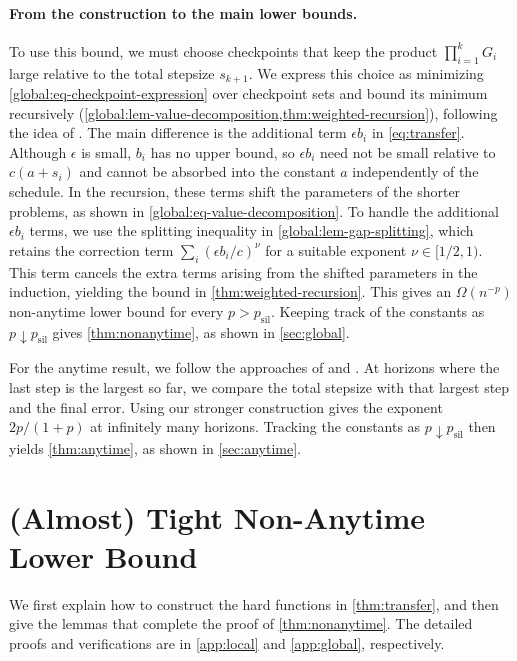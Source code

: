 \documentclass[11pt,letterpaper]{article}
\theoremstyle{definition}
\newcommand{\psil}{p_{\mathrm{sil}}}
\begin{document}
\paragraph{From the construction to the main lower bounds.}
To use this bound, we must choose checkpoints that keep the product $\prod_{i=1}^kG_i$ large relative to the total stepsize $s_{k+1}$.
We express this choice as minimizing \eqref{global:eq-checkpoint-expression} over checkpoint sets and bound its minimum recursively (\cref{global:lem-value-decomposition,thm:weighted-recursion}), following the idea of \citet[Section~3]{JungChoYun2026}.
The main difference is the additional term $\epsilon b_i$ in \eqref{eq:transfer}.
Although $\epsilon$ is small, $b_i$ has no upper bound, so $\epsilon b_i$ need not be small relative to $c(a+s_i)$ and cannot be absorbed into the constant $a$ independently of the schedule.
In the recursion, these terms shift the parameters of the shorter problems, as shown in \eqref{global:eq-value-decomposition}.
To handle the additional $\epsilon b_i$ terms, we use the splitting inequality in \cref{global:lem-gap-splitting}, which retains the correction term $\sum_i(\epsilon b_i/c)^\nu$ for a suitable exponent $\nu\in[1/2,1)$.
This term cancels the extra terms arising from the shifted parameters in the induction, yielding the bound in \cref{thm:weighted-recursion}.
This gives an $\Omega(n^{-p})$ non-anytime lower bound for every $p>\psil$.
Keeping track of the constants as $p\downarrow\psil$ gives \cref{thm:nonanytime}, as shown in \cref{sec:global}.

For the anytime result, we follow the approaches of \citet[Section~4.1]{TsaiFatkhullinZhangHe2026} and \citet[Section~4]{JungChoYun2026}.
At horizons where the last step is the largest so far, we compare the total stepsize with that largest step and the final error.
Using our stronger construction gives the exponent $2p/(1+p)$ at infinitely many horizons.
Tracking the constants as $p\downarrow\psil$ then yields \cref{thm:anytime}, as shown in \cref{sec:anytime}.

\section{(Almost) Tight Non-Anytime Lower Bound}
\label{sec:nonanytime}

We first explain how to construct the hard functions in \cref{thm:transfer}, and then give the lemmas that complete the proof of \cref{thm:nonanytime}.
The detailed proofs and verifications are in \cref{app:local} and \cref{app:global}, respectively.
\end{document}
